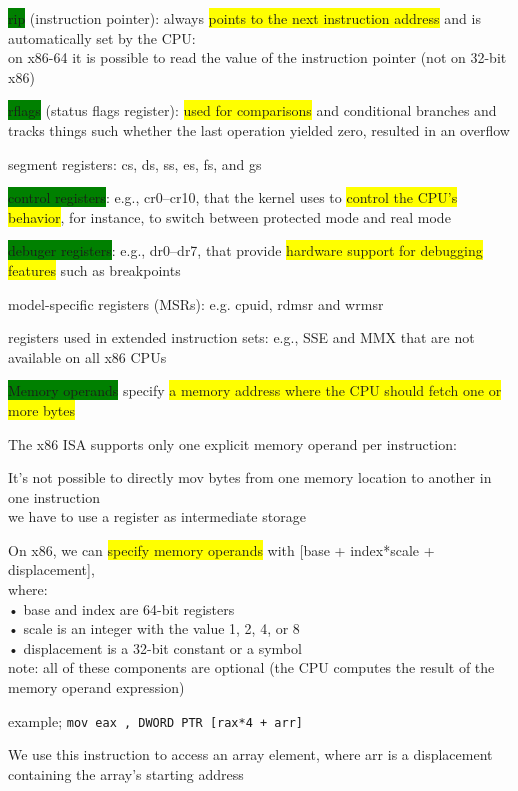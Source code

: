 \documentclass[]{project_plan}
\begin{document}
\colorbox{green}{rip} (instruction pointer): always \colorbox{yellow}{points to the next instruction address} and is automatically
set by the CPU:\\
on x86-64 it is possible to read the value of the instruction pointer (not on 32-bit x86)

\colorbox{green}{rflags} (status flags register): \colorbox{yellow}{used for comparisons} and conditional branches and tracks things such
whether the last operation yielded zero, resulted in an overflow

segment registers: cs, ds, ss, es, fs, and gs

\colorbox{green}{control registers}: e.g., cr0–cr10, that the kernel uses to \colorbox{yellow}{control the CPU’s behavior}, for
instance, to switch between protected mode and real mode

\colorbox{green}{debuger registers}: e.g., dr0–dr7, that provide \colorbox{yellow}{hardware support for debugging features} such as
breakpoints

model-specific registers (MSRs): e.g. cpuid, rdmsr and wrmsr

registers used in extended instruction sets: e.g., SSE and MMX that are not available on all x86
CPUs

\colorbox{green}{Memory operands} specify \colorbox{yellow}{a memory address where the CPU should fetch one or more bytes}

The x86 ISA supports only one explicit memory operand per instruction:

It’s not possible to directly mov bytes from one memory location to another in one instruction\\
we have to use a register as intermediate storage

On x86, we can \colorbox{yellow}{specify memory operands} with [base + index*scale + displacement],\\
where:\\
• base and index are 64-bit registers\\
• scale is an integer with the value 1, 2, 4, or 8\\
• displacement is a 32-bit constant or a symbol\\

note: all of these components are optional (the CPU computes the result of the memory operand
expression)

example; \lstinline|mov eax , DWORD PTR [rax*4 + arr]|

We use this instruction to access an array element, where arr is a displacement containing
the array’s starting address
\end{document}
